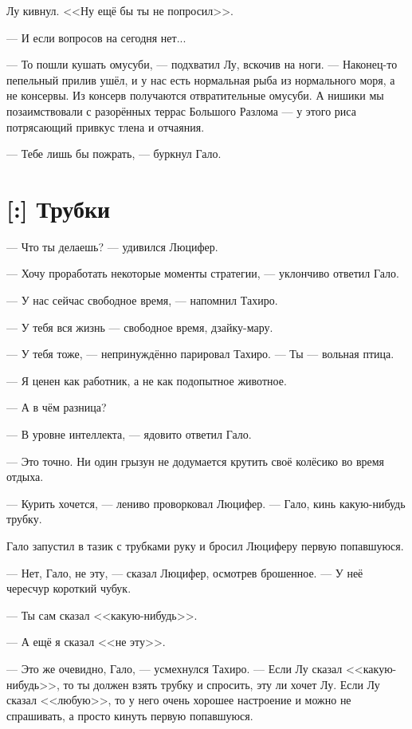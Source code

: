 Лу кивнул.
<<Ну ещё бы ты не попросил>>.

--- И если вопросов на сегодня нет...

--- То пошли кушать омусуби, --- подхватил Лу, вскочив на ноги.
--- Наконец-то пепельный прилив ушёл, и у нас есть нормальная рыба из нормального моря, а не консервы.
Из консерв получаются отвратительные омусуби.
А нишики мы позаимствовали с разорённых террас Большого Разлома --- у этого риса потрясающий привкус тлена и отчаяния.

--- Тебе лишь бы пожрать, --- буркнул Гало.

\section{[:] Трубки}

\textspace

--- Что ты делаешь? --- удивился Люцифер.

--- Хочу проработать некоторые моменты стратегии, --- уклончиво ответил Гало.

--- У нас сейчас свободное время, --- напомнил Тахиро.

--- У тебя вся жизнь --- свободное время, дзайку-мару.

--- У тебя тоже, --- непринуждённо парировал Тахиро.
--- Ты --- вольная птица.

--- Я ценен как работник, а не как подопытное животное.

--- А в чём разница?

--- В уровне интеллекта, --- ядовито ответил Гало.

--- Это точно.
Ни один грызун не додумается крутить своё колёсико во время отдыха.

--- Курить хочется, --- лениво проворковал Люцифер.
--- Гало, кинь какую-нибудь трубку.

Гало запустил в тазик с трубками руку и бросил Люциферу первую попавшуюся.

--- Нет, Гало, не эту, --- сказал Люцифер, осмотрев брошенное.
--- У неё чересчур короткий чубук.

--- Ты сам сказал <<какую-нибудь>>.

--- А ещё я сказал <<не эту>>.

--- Это же очевидно, Гало, --- усмехнулся Тахиро.
--- Если Лу сказал <<какую-нибудь>>, то ты должен взять трубку и спросить, эту ли хочет Лу.
Если Лу сказал <<любую>>, то у него очень хорошее настроение и можно не спрашивать, а просто кинуть первую попавшуюся.

